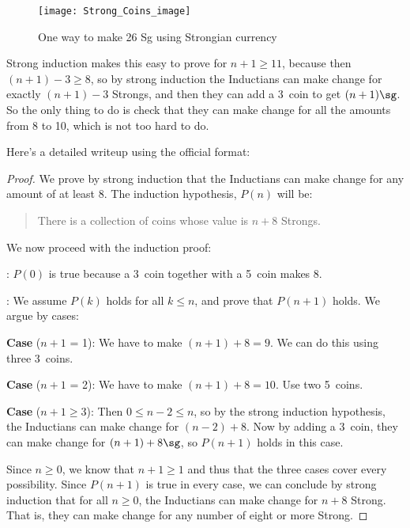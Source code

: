 \begin{figure}

\texttt{[image: Strong\_Coins\_image]}
\caption{One way to make 26 Sg using Strongian currency}
\label{strong_coins}
\end{figure}

Strong induction makes this easy to prove for $n+1 \ge 11$, because then
$(n+1)-3 \ge 8$, so by strong induction the Inductians can make change for
exactly $(n+1)-3$ Strongs, and then they can add a 3\sg\ coin to get
$(n+1)\sg$.  So the only thing to do is check that they can make change
for all the amounts from 8 to 10\sg, which is not too hard to do.

Here's a detailed writeup using the official format:

\begin{proof}

  We prove by strong induction that the Inductians can make change for any
  amount of at least 8\sg.  The induction hypothesis, $P(n)$ will be:
\begin{quote}
There is a collection of coins whose value is $n+8$ Strongs.
\end{quote}

We now proceed with the induction proof:

: $P(0)$ is true because a 3\sg\ coin together with
a 5\sg\ coin makes 8\sg.

:  We assume $P(k)$ holds for all $k \leq n$, and
prove that $P(n+1)$ holds.  We argue by cases:

\textbf{Case} ($n+1$ = 1): We have to make $(n+1) +8 =9$\sg.  We can do this using three 3\sg\ coins.

\textbf{Case} ($n+1$ = 2): We have to make $(n+1) +8 =10$\sg.  Use two
5\sg\ coins.

\textbf{Case} ($n+1 \geq 3$): Then $0 \leq n - 2 \leq n$, so by the
strong induction hypothesis, the Inductians can make change for
$(n-2)+8$\sg.  Now by adding a 3\sg\ coin, they can make change for
$(n+1)+8\sg$, so $P(n+1)$ holds in this case.

Since $n \ge 0$, we know that $n + 1 \ge 1$ and thus that the three
cases cover every possibility.  Since $P(n+1)$ is true in every case,
we can conclude by strong induction that for all $n \ge 0$, the
Inductians can make change for $n+8$ Strong.  That is, they can make
change for any number of eight or more Strong.
\end{proof}

